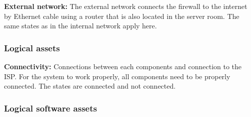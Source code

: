 \documentclass[english]{article}
\begin{document}
\begin{description}
		\item{\textbf{External network:}} The external network connects the firewall to the internet by Ethernet cable using a router that is also located in the server room. The same states as in the internal network apply here.
	\end{description}


\subsubsection{Logical assets}
	\begin{description}
		\item{\textbf{Connectivity:}} Connections between each components and connection to the ISP. For the system to work properly, all components need to be properly connected. The states are connected and not connected.
	\end{description}

\subsubsection{Logical software assets}
\end{document}
